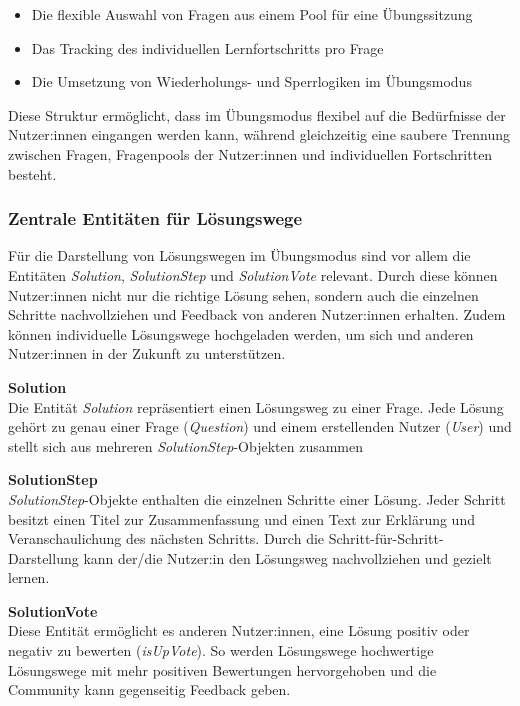 \begin{itemize}
  \item Die flexible Auswahl von Fragen aus einem Pool für eine Übungssitzung
  \item Das Tracking des individuellen Lernfortschritts pro Frage
  \item Die Umsetzung von Wiederholungs- und Sperrlogiken im Übungsmodus
\end{itemize}

Diese Struktur ermöglicht, dass im Übungsmodus flexibel auf die Bedürfnisse der Nutzer:innen eingangen werden kann, während
gleichzeitig eine saubere Trennung zwischen Fragen, Fragenpools der Nutzer:innen und  individuellen Fortschritten besteht.


\subsubsection{Zentrale Entitäten für Lösungswege}
Für die Darstellung von Lösungswegen im Übungsmodus sind vor allem die Entitäten \textit{Solution}, \textit{SolutionStep} und 
\textit{SolutionVote} relevant. Durch diese können Nutzer:innen nicht nur die richtige Lösung sehen, sondern auch die einzelnen Schritte 
nachvollziehen und Feedback von anderen Nutzer:innen erhalten. Zudem können individuelle Lösungswege hochgeladen werden, um 
sich und anderen Nutzer:innen in der Zukunft zu unterstützen.

\vspace{0.2cm}
\textbf{Solution} \\
Die Entität \textit{Solution} repräsentiert einen Lösungsweg zu einer Frage. Jede Lösung gehört zu genau einer Frage (\textit{Question}) 
und einem erstellenden Nutzer (\textit{User}) und stellt sich aus mehreren \textit{SolutionStep}-Objekten zusammen

\vspace{0.2cm}
\textbf{SolutionStep} \\
\textit{SolutionStep}-Objekte enthalten die einzelnen Schritte einer Lösung. Jeder Schritt besitzt einen Titel zur Zusammenfassung und 
einen Text zur Erklärung und Veranschaulichung des nächsten Schritts. Durch die Schritt-für-Schritt-Darstellung kann der/die Nutzer:in 
den Lösungsweg nachvollziehen und gezielt lernen.

\vspace{0.2cm}
\textbf{SolutionVote} \\
Diese Entität ermöglicht es anderen Nutzer:innen, eine Lösung positiv oder negativ zu bewerten (\textit{isUpVote}). So werden Lösungswege 
hochwertige Lösungswege mit mehr positiven Bewertungen hervorgehoben und die Community kann gegenseitig Feedback geben. 


